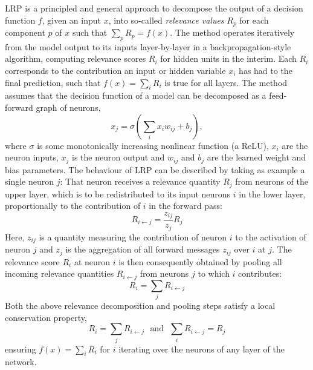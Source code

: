 \documentclass[10pt,twocolumn,letterpaper]{article}
\begin{document}
LRP is a principled and general approach to decompose the output of a decision function $f$, given an input $x$, into so-called \emph{relevance values} $R_p$ for each component $p$ of $x$ such that $\sum_p R_p = f(x)$.
The method operates iteratively from the model output to its inputs layer-by-layer in a backpropagation-style algorithm, computing relevance scores $R_i$ for hidden units in the interim. Each $R_i$ corresponds to the contribution an input or hidden variable $x_i$ has had to the final prediction, such that $f(x) = \sum_i R_i$ is true for all layers.
The method assumes that the decision function of a model can be decomposed as a feed-forward graph of neurons, \eg
\begin{equation}
x_j = \sigma\left(\sum_i x_iw_{ij} + b_j\right),
\end{equation}
where $\sigma$ is some monotonically increasing nonlinear function (\eg a ReLU), $x_i$ are the neuron inputs, $x_j$ is the neuron output and $w_{ij}$ and $b_j$ are the learned weight and bias parameters. The behaviour of LRP can be described by taking as example a single neuron $j$: That neuron receives a relevance quantity $R_j$ from neurons of the upper layer, which is to be redistributed to its input neurons $i$ in the lower layer, proportionally to the contribution of $i$ in the forward pass:
\begin{equation}
R_{i\leftarrow j} = \frac{z_{ij}}{z_j} R_j
\label{eq:lrpdecompose}
\end{equation}
Here, $z_{ij}$ is a quantity measuring the contribution of neuron $i$ to the activation of neuron $j$ and $z_j$ is the aggregation of all forward messages $z_{ij}$ over $i$ at $j$.
The relevance score $R_i$ at neuron $i$ is then consequently obtained by pooling all incoming relevance quantities $R_{i\leftarrow j}$ from neurons $j$ to which $i$ contributes:
\begin{equation}
R_i = \sum_j R_{i \leftarrow j}
\label{eq:lrppool}
\end{equation}
Both the above relevance decomposition and pooling steps satisfy a local conservation property, \ie
\begin{equation}
R_i = \sum_j R_{i \leftarrow j}~~~\text{and}~~~\sum_i R_{i\leftarrow j} = R_j
\label{eq:lrpconservation}
\end{equation}
ensuring $f(x) = \sum_i R_i$ for $i$ iterating over the neurons of any layer of the network.
\end{document}
